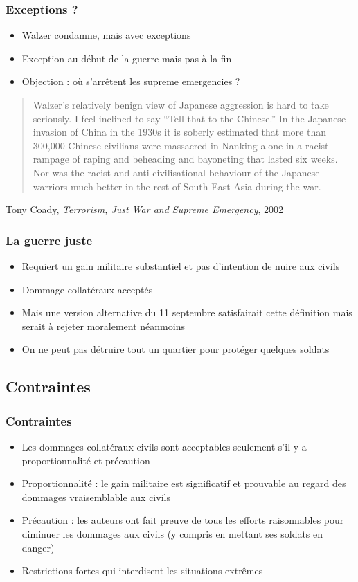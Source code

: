 \documentclass[english, french]{beamer}
\begin{document}
\begin{frame}
  \frametitle{Exceptions ?}
  \begin{itemize}
    \item Walzer condamne, mais avec exceptions
    \item Exception au début de la guerre mais pas à la fin
    \item Objection : où s’arrêtent les supreme emergencies ?
  \end{itemize}
  \begin{quote}
    Walzer’s relatively benign view of Japanese aggression is hard to take seriously. I feel inclined to say “Tell that to the Chinese.” In the Japanese invasion of China in the 1930s it is soberly estimated that more than 300,000 Chinese civilians were massacred in Nanking alone in a racist rampage of raping and beheading and bayoneting that lasted six weeks. Nor was the racist and anti-civilisational behaviour of the Japanese warriors much better in the rest of South-East Asia during the war.
  \end{quote}
  Tony Coady, \emph{Terrorism, Just War and Supreme Emergency}, 2002
\end{frame}

\begin{frame}
  \frametitle{La guerre juste}
  \begin{itemize}
    \item Requiert un gain militaire substantiel et pas d’intention de nuire aux civils
    \item Dommage collatéraux acceptés
    \item Mais une version alternative du 11 septembre satisfairait cette définition mais serait à rejeter moralement néanmoins
    \item On ne peut pas détruire tout un quartier pour protéger quelques soldats
  \end{itemize}
\end{frame}

\subsection{Contraintes}
\begin{frame}
  \frametitle{Contraintes}
  \begin{itemize}
    \item Les dommages collatéraux civils sont acceptables seulement s’il y a proportionnalité et précaution
    \item Proportionnalité : le gain militaire est significatif et prouvable au regard des dommages vraisemblable aux civils
    \item Précaution : les auteurs ont fait preuve de tous les efforts raisonnables pour diminuer les dommages aux civils (y compris en mettant ses soldats en danger)
    \item Restrictions fortes qui interdisent les situations extrêmes
  \end{itemize}
\end{frame}
\end{document}
